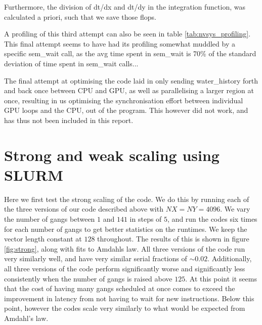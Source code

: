 \documentclass{article}
\begin{document}
Furthermore, the division of dt/dx and dt/dy in the integration function, was calculated a priori, such that we save those flops.

A profiling of this third attempt can also be seen in table \ref{tab:nvsys_profiling}. This final attempt seems to have had its profiling somewhat muddled by a specific sem\_wait call, as the avg time spent in sem\_wait is 70\% of the standard deviation of time spent in sem\_wait calls...

The final attempt at optimising the code laid in only sending water\_history forth and back once between CPU and GPU, as well as parallelising a larger region at once, resulting in us optimising the synchronisation effort between individual GPU loops and the CPU, out of the program. This however did not work, and has thus not been included in this report.

\section{Strong and weak scaling using SLURM}
Here we first test the strong scaling of the code. We do this by running each of the three versions of our code described above with $NX=NY=4096$. We vary the number of gangs between $1$ and $141$ in steps of $5$, and run the codes six times for each number of gangs to get better statistics on the runtimes. We keep the vector length constant at $128$ throughout. The results of this is shown in figure \ref{fig:strong}, along with fits to Amdahls law. All three versions of the code run very similarly well, and have very similar serial fractions of $\sim0.02$. Additionally, all three versions of the code perform significantly worse and significantly less consistently when the number of gangs is raised above $125$. At this point it seems that the cost of having many gangs scheduled at once comes to exceed the improvement in latency from not having to wait for new instructions. Below this point, however the codes scale very similarly to what would be expected from Amdahl's law.
\end{document}
